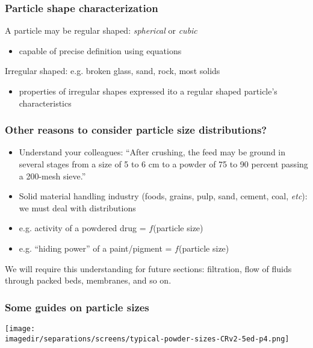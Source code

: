 \begin{frame}\frametitle{Particle shape characterization}
	
	A particle may be regular shaped: \emph{spherical} or \emph{cubic}
	\begin{itemize}
		\item	capable of precise definition using equations
	\end{itemize}
	
	\vspace{12pt}
	Irregular shaped: e.g. broken glass, sand, rock, most solids
	\begin{itemize}
		\item	properties of irregular shapes expressed ito a regular shaped particle's characteristics
	\end{itemize}
\end{frame}

\begin{frame}\frametitle{Other reasons to consider particle size distributions?}
	\begin{itemize}
		\item	Understand your colleagues: ``After crushing, the feed may be ground in several stages from a size of 5 to 6 cm to a powder of 75 to 90 percent passing a 200-mesh sieve.''
		\item	Solid material handling industry (foods, grains, pulp, sand, cement, coal, \emph{etc}): we must deal with distributions 
		\item	e.g. activity of a powdered drug = $f$(particle size)
		\item	e.g. ``hiding power'' of a paint/pigment = $f$(particle size)
	\end{itemize}
	
	\vspace{12pt}
	\begin{exampleblock}{}
		We will require this understanding for future sections: filtration, flow of fluids through packed beds, membranes, and so on.
	\end{exampleblock}
\end{frame}

\begin{frame}\frametitle{Some guides on particle sizes}
	\begin{center}
		\texttt{[image: \\imagedir/separations/screens/typical-powder-sizes-CRv2-5ed-p4.png]}
	\end{center}
\end{frame}

